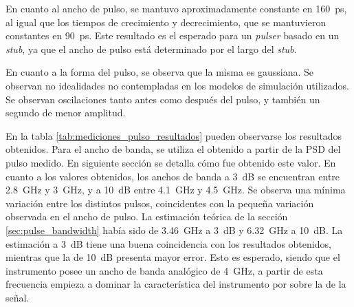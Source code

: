 En cuanto al ancho de pulso, se mantuvo aproximadamente constante en
\qty{160}{\pico\second}, al igual que los tiempos de crecimiento y
decrecimiento, que se mantuvieron constantes en \qty{90}{\pico\second}. Este
resultado es el esperado para un \textit{pulser} basado en un \textit{stub}, ya
que el ancho de pulso está determinado por el largo del \textit{stub}.

En cuanto a la forma del pulso, se observa que la misma es gaussiana. Se
observan no idealidades no contempladas en los modelos de simulación utilizados.
Se observan oscilaciones tanto antes como después del pulso, y también un
segundo de menor amplitud.

En la tabla \ref{tab:mediciones_pulso_resultados} pueden observarse los
resultados obtenidos. Para el ancho de banda, se utiliza el obtenido a partir de
la PSD del pulso medido. En siguiente sección se detalla cómo
fue obtenido este valor. En cuanto a los valores obtenidos, los anchos de banda a
\qty{3}{\dB} se encuentran entre \qty{2.8}{\giga\hertz} y \qty{3}{\giga\hertz},
y a \qty{10}{\dB} entre \qty{4.1}{\giga\hertz} y \qty{4.5}{\giga\hertz}. Se
observa una mínima variación entre los distintos pulsos, coincidentes con la
pequeña variación observada en el ancho de pulso. La estimación teórica de la
sección \ref{sec:pulse_bandwidth} había sido de \qty{3.46}{\giga\hertz} a
\qty{3}{\dB} y \qty{6.32}{\giga\hertz} a \qty{10}{\dB}. La estimación a
\qty{3}{\dB} tiene una buena coincidencia con los resultados obtenidos, mientras
que la de \qty{10}{\dB} presenta mayor error. Esto es esperado, siendo que el
instrumento posee un ancho de banda analógico de \qty{4}{\giga\hertz}, a partir
de esta frecuencia empieza a dominar la característica del instrumento por sobre
la de la señal.

